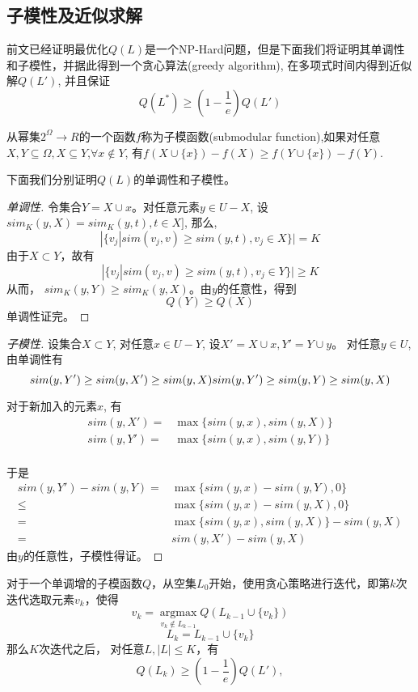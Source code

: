 \subsection{子模性及近似求解}
前文已经证明最优化$Q(L)$是一个NP-Hard问题，但是下面我们将证明其单调性和子模性，并据此得到一个贪心算法(greedy algorithm), 在多项式时间内得到近似解$Q(L')$, 并且保证
\[
	Q(L^*) \ge (1-\frac{1}{e}) Q(L')
\]

\begin{definition}[子模函数]
从幂集$2^\Omega \to R$的一个函数$f$称为子模函数(submodular function),如果对任意$X,Y \subseteq \Omega, X \subseteq Y$,$\forall x \notin Y$, 有$f(X \cup \{x\} ) - f(X) \geq f(Y \cup \{x\} ) - f(Y)$.
\end{definition}

下面我们分别证明$Q(L)$的单调性和子模性。
\begin{proof}[单调性]
令集合$Y=X\cup{x}$。对任意元素$y \in U - X$, 设$sim_K(y, X) = sim_K(y, t), t \in X]$,
那么,
\[
	|\{ {v_j}|sim({v_j},v) \ge sim(y, t), v_j \in X \} | = K	
\]
由于$X \subset Y$，故有
\[
	|\{ {v_j}|sim({v_j},v) \ge sim(y, t), v_j \in Y \} | \ge K	
\]
从而， $sim_K(y, Y) \ge sim_K(y, X)$。由$y$的任意性，得到
\[
	Q(Y) \ge Q(X)
\]
单调性证完。
\end{proof}

\begin{proof}[子模性]
设集合$X \subset Y$, 对任意$x \in U - Y$, 设$X' = X\cup{x}, Y' = Y\cup{y}$。
对任意$y \in U$, 由单调性有
\[
	sim(y, Y') \ge sim(y, X') \ge sim(y, X) \\
	sim(y, Y') \ge sim(y, Y) \ge sim(y, X) 
\]

对于新加入的元素$x$, 有
\begin{align*}
	sim(y, X') = & \max\{ sim(y, x), sim(y,X) \} \\
	sim(y, Y') = & \max\{ sim(y, x), sim(y,Y) \} \\
\end{align*}

于是
\begin{align*}
	sim(y, Y') - sim(y, Y) = & \max \{ sim(y, x) - sim(y, Y), 0\} \\
						\le & \max \{ sim(y, x) - sim(y, X), 0 \} \\
						= & \max \{ sim(y, x), sim(y, X) \} - sim(y, X) \\
						= & sim(y, X') - sim(y, X)						
\end{align*}
由$y$的任意性，子模性得证。
\end{proof}

\begin{theorem}
对于一个单调增的子模函数$Q$，从空集$L_0$开始，使用贪心策略进行迭代，即第$k$次迭代选取元素$v_k$，使得
\[
	v_k = \mathop {\arg \max }\limits_{v_k \notin L_{k-1} } Q(L_{k-1}\cup \{v_k\}) 
\]
\[
	L_k = L_{k-1} \cup \{ v_k \} 
\]
那么$K$次迭代之后， 对任意$L, |L| \le K$，有
\[
	Q(L_k) \ge (1-\frac{1}{e}) Q(L'),
\]
\end{theorem}

